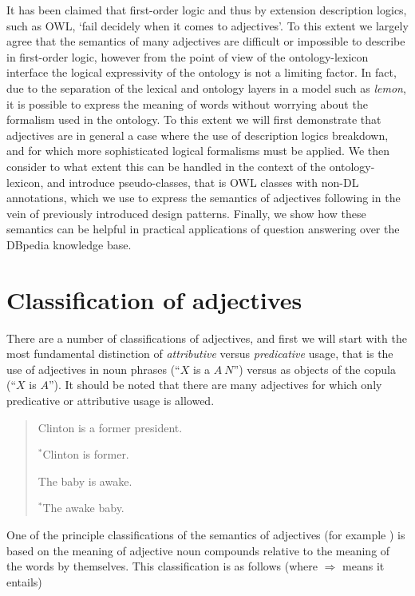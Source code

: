 \documentclass[11pt]{article}
\begin{document}
It has been claimed that first-order logic and thus by extension description logics, such as OWL, `fail decidely when it comes to adjectives'\cite{bankston2003modeling}. To this extent we largely agree that the semantics of many adjectives are difficult or impossible to describe in first-order logic, however from the point of view of the ontology-lexicon interface the logical expressivity of the ontology is not a limiting factor. In fact, due to the separation of the lexical and ontology layers in a model such as \emph{lemon}, it is possible to express the meaning of words without worrying about the formalism used in the ontology. To this extent we will first demonstrate that adjectives are in general a case where the use of description logics breakdown, and for which more sophisticated logical formalisms must be applied. We then consider to what extent this can be handled in the context of the ontology-lexicon, and introduce pseudo-classes, that is OWL classes with non-DL annotations, which we use to express the semantics of adjectives following in the vein of previously introduced design patterns\cite{mccrae??}. Finally, we show how these semantics can be helpful in practical applications of question answering over the DBpedia knowledge base.

\section{Classification of adjectives}

There are a number of classifications of adjectives, and first we will start with the most fundamental distinction of \emph{attributive} versus \emph{predicative} usage, that is the use of adjectives in noun phrases (``$X$ is a $A~N$'') versus as objects of the copula (``$X$ is $A$''). It should be noted that there are many adjectives for which only predicative or attributive usage is allowed.

\begin{quote}
	Clinton is a former president.
	
	$^*$Clinton is former.
	
	The baby is awake.
	
	$^*$The awake baby.
\end{quote}

One of the principle classifications of the semantics of adjectives (for example \cite{partee2003are}) is based on the meaning of adjective noun compounds relative to the meaning of the words by themselves. This classification is as follows (where $\Rightarrow$ means it entails)
\end{document}
